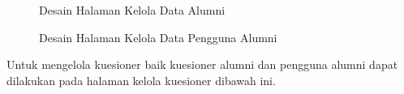 \begin{figure}[H]
	\centering
	\caption{Desain Halaman Kelola Data Alumni}
	\label{admin_kelolaalumni}
\end{figure}

\begin{figure}[H]
	\centering
	\caption{Desain Halaman Kelola Data Pengguna Alumni}
	\label{admin_kelolapengguna}
\end{figure}

Untuk mengelola kuesioner baik kuesioner alumni dan pengguna alumni dapat dilakukan pada halaman kelola kuesioner dibawah ini. 

